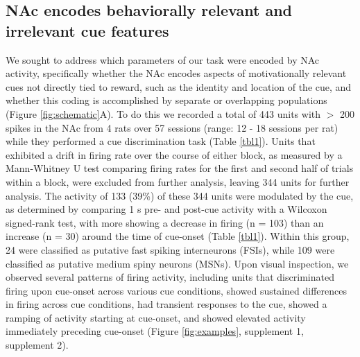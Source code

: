 \documentclass[11pt]{article}
\begin{document}
\subsection*{NAc encodes behaviorally relevant and irrelevant cue features}

We sought to address which parameters of our task were encoded by NAc
activity, specifically whether the NAc encodes aspects of
motivationally relevant cues not directly tied to reward, such as the
identity and location of the cue, and whether this coding is
accomplished by separate or overlapping populations (Figure
\ref{fig:schematic}A). To do this we recorded a total of 443 units
with $>$ 200 spikes in the NAc from 4 rats over 57 sessions (range: 12
- 18 sessions per rat) while they performed a cue discrimination task
(Table \ref{tbl1}). Units that exhibited a drift in firing rate over
the course of either block, as measured by a Mann-Whitney U test comparing
firing rates for the first and second half of trials within a block,
were excluded from further analysis, leaving 344 units for further
analysis. The activity of 133 (39\%) of these 344 units were modulated
by the cue, as determined by comparing 1 s pre- and post-cue activity with a Wilcoxon signed-rank test, with more showing a decrease in firing (n = 103) than an
increase (n = 30) around the time of cue-onset (Table
\ref{tbl1}). Within this group, 24 were classified as putative fast spiking interneurons (FSIs), while 109
were classified as putative medium spiny neurons (MSNs). Upon visual inspection, we observed several
patterns of firing activity, including units that discriminated firing
upon cue-onset across various cue conditions, showed sustained
differences in firing across cue conditions, had transient responses
to the cue, showed a ramping of activity starting at cue-onset, and
showed elevated activity immediately preceding cue-onset (Figure
\ref{fig:examples}, supplement 1, supplement 2).
\end{document}
